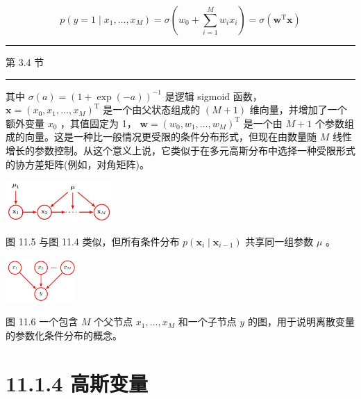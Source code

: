 \documentclass[10pt]{article}
\newcommand{\HRule}{\begin{center}\rule{0.9\linewidth}{0.2mm}\end{center}}
\begin{document}
\[
p\left( {y = 1 \mid  {x}_{1},\ldots ,{x}_{M}}\right)  = \sigma \left( {{w}_{0} + \mathop{\sum }\limits_{{i = 1}}^{M}{w}_{i}{x}_{i}}\right)  = \sigma \left( {{\mathbf{w}}^{\mathrm{T}}\mathbf{x}}\right)  \tag{11.8}
\]

\HRule

第 3.4 节

\HRule

其中 \(\sigma \left( a\right)  = {\left( 1 + \exp \left( -a\right) \right) }^{-1}\) 是逻辑 sigmoid 函数， \(\mathbf{x} = {\left( {x}_{0},{x}_{1},\ldots ,{x}_{M}\right) }^{\mathrm{T}}\) 是一个由父状态组成的 \(\left( {M + 1}\right)\) 维向量，并增加了一个额外变量 \({x}_{0}\) ，其值固定为 1， \(\mathbf{w} = {\left( {w}_{0},{w}_{1},\ldots ,{w}_{M}\right) }^{\mathrm{T}}\) 是一个由 \(M + 1\) 个参数组成的向量。这是一种比一般情况更受限的条件分布形式，但现在由数量随 \(M\) 线性增长的参数控制。从这个意义上说，它类似于在多元高斯分布中选择一种受限形式的协方差矩阵(例如，对角矩阵)。

\begin{center}
\includegraphics[max width=0.3\textwidth]{images/0194e279-9b28-703a-88f4-c3ac21e2010d_350_1073_1825_475_185_0.jpg}
\end{center}
\hspace*{3em} 

图 11.5 与图 11.4 类似，但所有条件分布 \(p\left( {{\mathbf{x}}_{i} \mid  {\mathbf{x}}_{i - 1}}\right)\) 共享同一组参数 \(\mu\) 。

\begin{center}
\includegraphics[max width=0.2\textwidth]{images/0194e279-9b28-703a-88f4-c3ac21e2010d_351_1202_344_349_220_0.jpg}
\end{center}
\hspace*{3em} 

图 11.6 一个包含 \(M\) 个父节点 \({x}_{1},\ldots ,{x}_{M}\) 和一个子节点 \(y\) 的图，用于说明离散变量的参数化条件分布的概念。

\section*{11.1.4 高斯变量}
\end{document}
